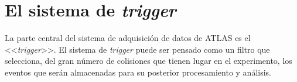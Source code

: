 

\section{El sistema de \emph{trigger}}

La parte central del sistema de adquisición de datos de ATLAS es el
<<\emph{trigger}>>. El sistema de \emph{trigger} puede ser pensado como un filtro que
selecciona, del gran número de colisiones que tienen lugar en el experimento,
los eventos que serán almacenadas para su posterior procesamiento y análisis.

